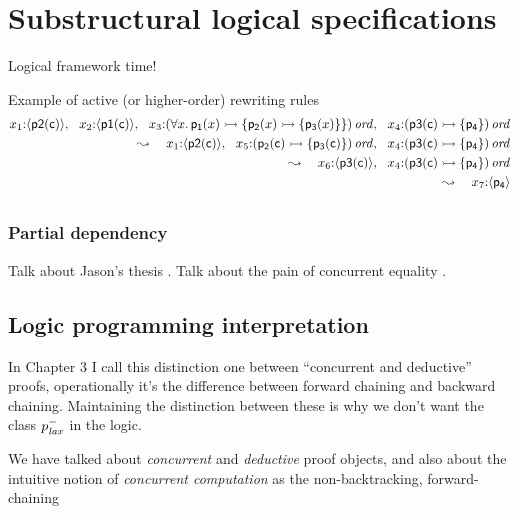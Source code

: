 \chapter{Substructural logical specifications}
\label{chapter-framework}

Logical framework time!

Example of active (or higher-order) rewriting rules
\begin{align*}
x_1{:}\langle {{\sf p2}({\sf c})} \rangle, ~~
x_2{:}\langle {{\sf p1}({\sf c})} \rangle, ~~
x_3{:}{(\forall x.\,{\sf p_1}(x) 
                \rightarrowtail \{ {\sf p_2}(x) \rightarrowtail \{ {\sf p_3}(x) \} \})}\,{{\it ord}}, ~~
x_4{:}{({\sf p3}({\sf c}) \rightarrowtail \{ {\sf p_4} \})}\,{{\it ord}} & \\
\leadsto ~~~ 
x_1{:}\langle {{\sf p2}({\sf c})} \rangle, ~~
x_5{:}{({\sf p_2}({\sf c}) \rightarrowtail \{ {\sf p_3}({\sf c}) \})}\,{{\it ord}}, ~~
x_4{:}{({\sf p3}({\sf c}) \rightarrowtail \{ {\sf p_4} \})}\,{{\it ord}} & \\
\leadsto ~~~ 
x_6{:}\langle {{\sf p3}({\sf c})} \rangle, ~~
x_4{:}{({\sf p3}({\sf c}) \rightarrowtail \{ {\sf p_4} \})}\,{{\it ord}} & \\
\leadsto ~~~ 
x_7{:}\langle {{\sf p_4}} \rangle & \\
\end{align*}


\section{}


\subsection{Partial dependency}
\label{sec:why-not-fully-dependent}

Talk about Jason's thesis \cite{}. Talk about the pain of concurrent 
equality \cite{}.



\section{Logic programming interpretation}
\label{sec:framework-logicprog}

In Chapter 3 I call this distinction one between ``concurrent and deductive''
proofs, operationally it's the difference between forward chaining 
and backward chaining. Maintaining the distinction between these is why
we don't want the class $p^-_{\it lax}$ in the logic.

We have talked about {\it concurrent} and {\it deductive} proof
objects, and also about the intuitive notion of {\it concurrent
  computation} as the non-backtracking, forward-chaining 

